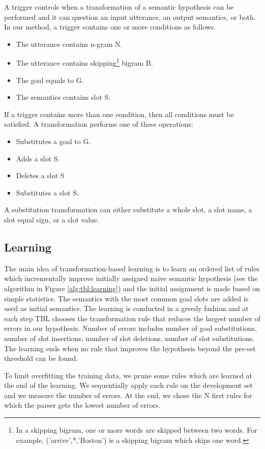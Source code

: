 \documentclass{article}
\begin{document}
A trigger controls when a transformation of a semantic hypothesis can be performed and it can question an input utterance, an output semantics, or both. In our method, a trigger contains one or more conditions as follows.
\begin{itemize}
  \item The utterance contains n-gram N.
  \item The utterance contains skipping\footnote{In a skipping bigram, one or more words are skipped between two words. For example, ('arrive',*,'Boston') is a skipping bigram which skips one word.} bigram B.
  \item The goal equals to G.
  \item The semantics contains slot S.
\end{itemize}
If a trigger contains more than one condition, then all conditions must be satisfied. A transformation performs one of these operations:
\begin{itemize}
  \item Substitutes a goal to G.
  \item Adds a slot S.
  \item Deletes a slot S
  \item Substitutes a slot S.
\end{itemize}
A substitution transformation can either substitute a whole slot, a slot name, a slot equal sign, or a slot value.

\subsection{Learning} \label{sec:tbl:learning}
The main idea of transformation-based learning is to learn an ordered list of rules which incrementally improve initially assigned naive semantic hypothesis (see the algorithm in Figure \ref{alg:tbl:learning}) and the initial assignment is made based on simple statistics. The semantics with the most common goal slots are added is used as initial semantics. The learning is conducted in a greedy fashion and at each step TBL chooses the transformation rule that reduces the largest number of errors in our hypothesis. Number of errors includes number of goal substitutions, number of slot insertions, number of slot deletions, number of slot substitutions. The learning ends when no rule that improves the hypothesis beyond the pre-set threshold can be found.

To limit overfitting the training data, we prune some rules which are learned at the end of the learning. We sequentially apply each rule on the development set and we measure the number of errors. At the end, we chose the N first rules for which the parser gets the lowest number of errors.
\end{document}
